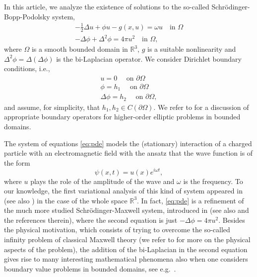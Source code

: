 \documentclass[reqno]{amsart}
\begin{document}
In this article, we analyze the existence of solutions to the so-called Schr\"odinger-Bopp-Podolsky system,
\begin{equation} \label{eq:pde}
  \begin{gathered}
 - \frac{1}{2} \Delta u + \phi u - g(x, u)  =  \omega u  \quad \text{in } \Omega \\
 - \Delta \phi + \Delta^2 \phi  =  4 \pi u^2  \quad \text{in } \Omega,
 \end{gathered}
\end{equation}
where $\Omega$ is a smooth bounded domain in $\mathbb R^3$, $g$ is a suitable 
nonlinearity and $\Delta^2 \phi = \Delta (\Delta \phi)$ is the bi-Laplacian operator. 
We consider Dirichlet boundary conditions, i.e.,
\begin{equation}
 \label{eq:Dirichlet_BC}
\begin{gathered}
 u  =  0  \quad \text{ on } \partial\Omega \\
 \phi  =  h_1  \quad \text{ on } \partial\Omega \\
 \Delta \phi  =  h_2  \quad \text{ on } \partial\Omega,
 \end{gathered}
\end{equation}
and assume, for simplicity, that $h_1, h_2 \in C(\partial\Omega)$.
We refer to \cite{GazzolaGrunauSweers2010} for a discussion of appropriate boundary 
operators for higher-order elliptic problems in bounded domains.

The system of equations \eqref{eq:pde} models the (stationary) interaction of a
charged particle with an electromagnetic field with the ansatz that the wave function 
is of the form
\[
 \psi(x, t) = u(x) e^{i \omega t},
\]
where $u$ plays the role of the amplitude of the wave and $\omega$ is the frequency. 
To our knowledge, the first variational analysis of this kind of system appeared in 
\cite{dAveniaSiciliano2019} (see also 
\cite{QuoirinSicilianoSilva2024, MascaroSiciliano2022}) in the case of the whole space 
$\mathbb R^3$. In fact, \eqref{eq:pde} is a refinement of the much more studied 
Schr\"odinger-Maxwell system, introduced in \cite{BenciFortunato1998} 
(see also \cite{PisaniSiciliano2007b,PisaniSiciliano2007,PisaniSiciliano2013} and the 
references therein), where the second equation is just $- \Delta \phi = 4\pi u^2$.
 Besides the physical motivation, which consists of trying to overcome the so-called 
 infinity problem of classical Maxwell theory (we refer to \cite{dAveniaSiciliano2019} 
for more on the physical aspects of the problem), the addition of the bi-Laplacian 
in the second equation gives rise to many interesting mathematical phenomena also when 
one considers boundary value problems in bounded domains, see e.g.\
\cite{AfonsoSiciliano2021}.
\end{document}
